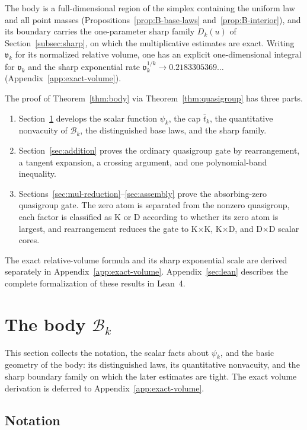 \documentclass[11pt]{article}
\theoremstyle{definition}
\theoremstyle{remark}
\newcommand{\body}{\mathcal{B}}
\begin{document}
The body is a full-dimensional region of the simplex containing the
uniform law and all point masses (Propositions~\ref{prop:B-base-laws}
and~\ref{prop:B-interior}), and its boundary carries the one-parameter
sharp family $D_k(u)$ of Section~\ref{subsec:sharp}, on which the
multiplicative estimates are exact.  Writing $\mathfrak v_k$ for its
normalized relative volume, one has an explicit one-dimensional integral
for $\mathfrak v_k$ and the sharp exponential rate
$\mathfrak v_k^{1/k}\to0.2183305369\ldots$
(Appendix~\ref{app:exact-volume}).

The proof of Theorem~\ref{thm:body} via Theorem~\ref{thm:quasigroup} has three parts.

\begin{enumerate}
\item Section~\ref{sec:invariant} develops the scalar function
$\psi_k$, the cap $\bar t_k$, the quantitative nonvacuity of $\body_k$,
the distinguished base laws, and the sharp family.
\item Section~\ref{sec:addition} proves the ordinary quasigroup gate by
rearrangement, a tangent expansion, a crossing argument, and one
polynomial-band inequality.
\item Sections~\ref{sec:mul-reduction}--\ref{sec:assembly} prove the
absorbing-zero quasigroup gate.  The zero atom is separated from the
nonzero quasigroup, each factor is classified as K or D according to whether
its zero atom is largest, and rearrangement reduces the gate to K$\times$K,
K$\times$D, and D$\times$D scalar cores.
\end{enumerate}

The exact relative-volume formula and its sharp exponential scale are derived
separately in Appendix~\ref{app:exact-volume}.
Appendix~\ref{sec:lean} describes the complete formalization of these results
in Lean~4.

\section{The body \texorpdfstring{$\body_k$}{Bk}}\label{sec:invariant}

This section collects the notation, the scalar facts about $\psi_k$,
and the basic geometry of the body: its distinguished laws, its quantitative
nonvacuity, and the sharp boundary family on which the later estimates are
tight.  The exact volume derivation is deferred to
Appendix~\ref{app:exact-volume}.

\subsection{Notation}\label{subsec:notation}
\end{document}
